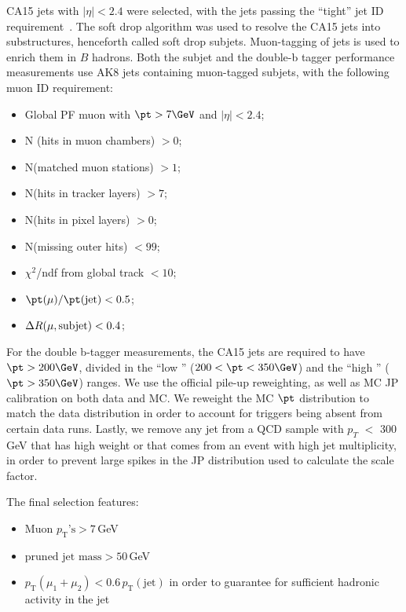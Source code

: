 CA15 jets with $|\eta| < 2.4$ were selected, with the jets passing the ``tight'' jet ID requirement~\cite{JetID13TeVTWiki}. The soft drop algorithm was used to resolve the CA15 jets into substructures, henceforth called soft drop subjets. Muon-tagging of jets is used to enrich them in $B$ hadrons. Both the subjet and the double-b tagger performance measurements use AK8 jets containing muon-tagged subjets, with the following muon ID requirement:

\begin{itemize}
\item Global PF muon with $\pt > 7\GeV$ and $|\eta| < 2.4$;
\item N (hits in muon chambers) $> 0$;
\item N(matched muon stations) $> 1$;
\item N(hits in tracker layers) $> 7$;
\item N(hits in pixel layers) $> 0$;
\item N(missing outer hits) $< 99$;
\item $\chi^{2}$/ndf from global track $< 10$;
\item $\pt(\mu)/\pt({\rm jet})  < 0.5$;
\item $\Delta R(\mu, {\rm subjet}) < 0.4$;
\end{itemize}

For the double b-tagger measurements, the CA15 jets are required to have $\pt > 200\GeV$, divided in the ``low \pt'' ($200 < \pt < 350\GeV$) and the ``high \pt'' ($\pt > 350\GeV$) ranges. We use the official pile-up reweighting, as well as MC JP calibration on both data and MC.
We reweight the MC $\pt$ distribution to match the data distribution in order to account for triggers being absent from certain data runs. Lastly, we remove any jet from a QCD sample with $p_{T}$ $<$ 300 GeV that has high weight or that comes from an event with high jet multiplicity, in order to prevent large spikes in the JP distribution used to calculate the scale factor.

The final selection features:

\begin{itemize}
\item Muon $p_\text{T}\text{'s}>7$\,GeV
\item $\text{pruned~jet~mass}>50$\,GeV
\item $p_\text{T}(\mu_1+\mu_2)<0.6\,p_\text{T}(\text{jet})$ in order to guarantee for sufficient hadronic activity in the jet 
\end{itemize}


